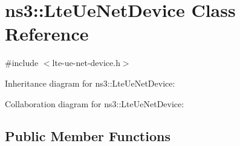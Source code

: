 \hypertarget{classns3_1_1LteUeNetDevice}{}\section{ns3\+:\+:Lte\+Ue\+Net\+Device Class Reference}
\label{classns3_1_1LteUeNetDevice}


{\ttfamily \#include $<$lte-\/ue-\/net-\/device.\+h$>$}



Inheritance diagram for ns3\+:\+:Lte\+Ue\+Net\+Device\+:


Collaboration diagram for ns3\+:\+:Lte\+Ue\+Net\+Device\+:
\subsection*{Public Member Functions}

